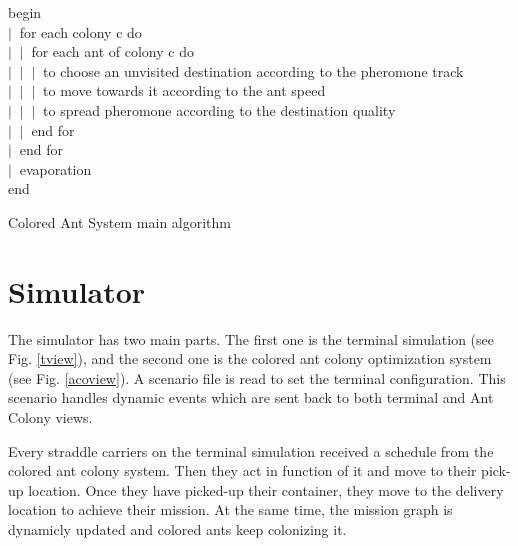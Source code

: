 \documentclass[a4paper,10pt]{article}
\makeatletter
\newenvironment{figurehere}
{\def\@captype{figure}}
{}
\makeatother
\begin{document}
\begin{multicols}{2}
		\begin{figurehere}
		 	\begin{flushleft}
			begin\\
			$\vert \;\;$for each colony c do\\
			$\vert \;\;\vert \;\;$for each ant of colony c do\\
			$\vert \;\;\vert \;\;\vert \;\;$to choose an unvisited destination according to the pheromone track\\
			$\vert \;\;\vert \;\;\vert \;\;$to move towards it according to the ant speed\\
			$\vert \;\;\vert \;\;\vert \;\;$to spread pheromone according to the destination quality\\
			$\vert \;\;\vert \;\;$end for\\
			$\vert \;\;$end for\\
			$\vert \;\;$evaporation\\
			end\\
			\end{flushleft}
			
		 	\caption{Colored Ant System main algorithm}
			\label{algo}
		\end{figurehere}
		
	\section*{Simulator}
		The simulator has two main parts. The first one is the terminal simulation (see Fig. \ref{tview}), and the second one is the colored ant colony optimization system (see Fig. \ref{acoview}).
		A scenario file is read to set the terminal configuration. This scenario handles dynamic events which are sent back to both terminal and Ant Colony views.

		Every straddle carriers on the terminal simulation received a schedule from the colored ant colony system. Then they act in function of it and move to their pick-up location. Once they have picked-up their container, they move to the delivery location to achieve their mission. At the same time, the mission graph is dynamicly updated and colored ants keep colonizing it.


\end{multicols}
\end{document}
